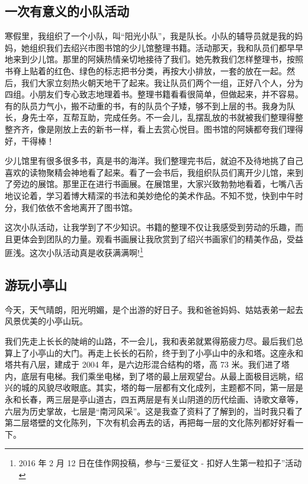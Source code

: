\documentclass[UTF8,a4paper,titlepage,twoside,10.5pt]{article}
\begin{document}
\subsection{一次有意义的小队活动}
\label{sec:org6321f55}

寒假里，我组织了一个小队，叫“阳光小队”，我是队长。小队的辅导员就是我的妈妈，她组织我们去绍兴市图书馆的少儿馆整理书籍。活动那天，我和队员们都早早地来到少儿馆。那里的阿姨热情亲切地接待了我们。她先教我们怎样整理书，按照书脊上贴着的红色、绿色的标志把书分类，再按大小排放，一套的放在一起。然后，我们大家立刻热火朝天地干了起来。我让队员们两个一组，正好八个人，分为四组。小朋友们专心致志地理着书。整理书籍看看很简单，但做起来，并不容易。有的队员力气小，搬不动重的书，有的队员个子矮，够不到上层的书。我身为队长，身先士卒，互帮互助，完成任务。不一会儿，乱摆乱放的书就被我们整理得整整齐齐，像是刚放上去的新书一样，看上去赏心悦目。图书馆的阿姨都夸我们理得好，干得棒！

少儿馆里有很多很多书，真是书的海洋。我们整理完书后，就迫不及待地挑了自己喜欢的读物聚精会神地看了起来。看了一会书后，我组织队员们离开少儿馆，来到了旁边的展馆。那里正在进行书画展。在展馆里，大家兴致勃勃地看着，七嘴八舌地议论着，学习着博大精深的书法和美妙绝伦的美术作品。不知不觉，快到中午时分，我们依依不舍地离开了图书馆。

这次小队活动，让我学到了不少知识。书籍的整理不仅让我感受到劳动的乐趣，而且更体会到团队的力量。观看书画展让我欣赏到了绍兴书画家们的精美作品，受益匪浅。这次小队活动真是收获满满啊!\footnote{2016 年 2 月 12 日在佳作网投稿，参与“三爱征文 - 扣好人生第一粒扣子”活动}

\subsection{游玩小亭山}
\label{sec:orgf61ab38}

今天，天气晴朗，阳光明媚，是个出游的好日子。我和爸爸妈妈、姑姑表弟一起去风景优美的小亭山玩。

我们先走上长长的陡峭的山路，不一会儿，我和表弟就累得筋疲力尽。最后我们总算上了小亭山的大门。再走上长长的石阶，终于到了小亭山中的永和塔。这座永和塔共有八层，建成于 2004 年，是六边形混合结构的塔，高 73 米。我们进了塔内，底层有电梯。我们乘坐电梯，到了塔的最上层观望台。从最上面极目远眺，绍兴的城的风貌尽收眼底。其实，塔的每一层都有文化成列，主题都不同，第一层是永和长春，两三层是亭山道古，四五两层是有关山阴道的历代绘画、诗歌文章等，六层为历史掌故，七层是“南河风采”。这是我查了资料了了解到的，当时我只看了第二层塔壁的文化陈列，下次有机会再去的话，再把每一层的文化陈列都好好看一下。
\end{document}

